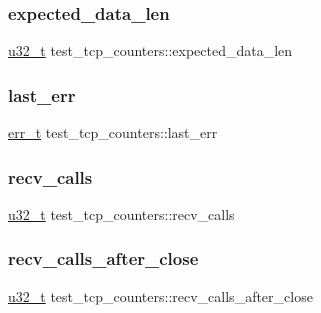 \subsubsection{\texorpdfstring{expected\+\_\+data\+\_\+len}{expected\_data\_len}}
{\footnotesize\ttfamily \hyperlink{group__compiler__abstraction_ga4c14294869aceba3ef9d4c0c302d0f33}{u32\+\_\+t} test\+\_\+tcp\+\_\+counters\+::expected\+\_\+data\+\_\+len}

\mbox{\label{structtest__tcp__counters_ac63af9f4d7d64d9f38fd165469e16741}} 
\subsubsection{\texorpdfstring{last\+\_\+err}{last\_err}}
{\footnotesize\ttfamily \hyperlink{group__infrastructure__errors_gaf02d9da80fd66b4f986d2c53d7231ddb}{err\+\_\+t} test\+\_\+tcp\+\_\+counters\+::last\+\_\+err}

\mbox{\label{structtest__tcp__counters_af31bbabce2e91642b6e39fee0b0a1ac4}} 
\subsubsection{\texorpdfstring{recv\+\_\+calls}{recv\_calls}}
{\footnotesize\ttfamily \hyperlink{group__compiler__abstraction_ga4c14294869aceba3ef9d4c0c302d0f33}{u32\+\_\+t} test\+\_\+tcp\+\_\+counters\+::recv\+\_\+calls}

\mbox{\label{structtest__tcp__counters_af23337c680f3c9c867541d8807a042e1}} 
\subsubsection{\texorpdfstring{recv\+\_\+calls\+\_\+after\+\_\+close}{recv\_calls\_after\_close}}
{\footnotesize\ttfamily \hyperlink{group__compiler__abstraction_ga4c14294869aceba3ef9d4c0c302d0f33}{u32\+\_\+t} test\+\_\+tcp\+\_\+counters\+::recv\+\_\+calls\+\_\+after\+\_\+close}

